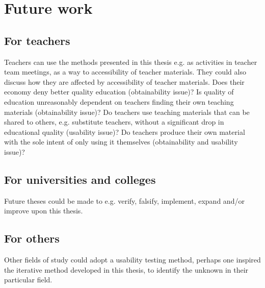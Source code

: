 \section{Future work}	
\subsection{For teachers}
Teachers can use the methods presented in this thesis e.g. as activities in teacher team meetings, as a way to accessibility of teacher materials. They could also discuss how they are affected by accessibility of teacher materials. 
Does their economy deny better quality education (obtainability issue)? Is quality of education unreasonably dependent on teachers finding their own teaching materials (obtainability issue)? Do teachers use teaching materials that can be shared to others, e.g. substitute teachers, without a significant drop in educational quality (usability issue)? Do teachers produce their own material with the sole intent of only using it themselves (obtainability and usability issue)?
\subsection{For universities and colleges}
Future theses could be made to e.g. verify, falsify, implement, expand and/or improve upon this thesis.
\subsection{For others}
Other fields of study could adopt a usability testing method, perhaps one inspired the iterative method developed in this thesis, to identify the unknown in their particular field. 